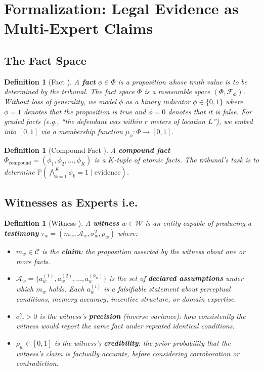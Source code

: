 \documentclass[11pt,a4paper]{article}
\newtheorem{definition}[theorem]{Definition}
\theoremstyle{definition}
\newcommand{\Pbb}{\mathbb{P}}
\newcommand{\witnessSet}{\mathcal{W}}           %
\newcommand{\fact}{\phi}                        %
\newcommand{\claimSpace}{\mathcal{C}}           %
\begin{document}
\section{Formalization: Legal Evidence as Multi-Expert Claims }
\label{sec:formalization}

\subsection{The Fact Space }

\begin{definition}[Fact ]
\label{def:fact}
A \textbf{fact} $\fact \in \Phi$ is a proposition whose truth value is to be determined by the tribunal. The fact space $\Phi$ is a measurable space $(\Phi, \mathcal{F}_\Phi)$. Without loss of generality, we model $\fact$ as a binary indicator $\fact \in \{0, 1\}$ where $\fact = 1$ denotes that the proposition is true and $\fact = 0$ denotes that it is false. For graded facts (e.g., ``the defendant was within $r$ meters of location $L$''), we embed into $[0, 1]$ via a membership function $\mu_\fact: \Phi \to [0, 1]$.
\end{definition}

\begin{definition}[Compound Fact ]
\label{def:compound}
A \textbf{compound fact} $\Phi_{\mathrm{compound}} = (\fact_1, \fact_2, \ldots, \fact_K)$ is a $K$-tuple of atomic facts. The tribunal's task is to determine $\Pbb(\bigwedge_{k=1}^K \fact_k = 1 \mid \text{evidence})$.
\end{definition}

\subsection{Witnesses as Experts i.e.}

\begin{definition}[Witness ]
\label{def:witness}
A \textbf{witness} $w \in \witnessSet$ is an entity capable of producing a \textbf{testimony} $\tau_w = (m_w, \mathcal{A}_w, \sigma_w^2, \rho_w)$ where:
\begin{itemize}
    \item $m_w \in \claimSpace$ is the \textbf{claim}: the proposition asserted by the witness about one or more facts.
    \item $\mathcal{A}_w = \{a_w^{(1)}, a_w^{(2)}, \ldots, a_w^{(k_w)}\}$ is the set of \textbf{declared assumptions} under which $m_w$ holds. Each $a_w^{(i)}$ is a falsifiable statement about perceptual conditions, memory accuracy, incentive structure, or domain expertise.
    \item $\sigma_w^2 > 0$ is the witness's \textbf{precision} (inverse variance): how consistently the witness would report the same fact under repeated identical conditions.
    \item $\rho_w \in [0, 1]$ is the witness's \textbf{credibility}: the prior probability that the witness's claim is factually accurate, before considering corroboration or contradiction.
\end{itemize}
\end{definition}
\end{document}
